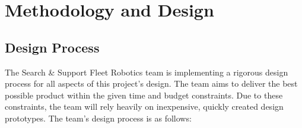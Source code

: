 \section{Methodology and Design}

\subsection{Design Process}

The Search \& Support Fleet Robotics team is implementing a rigorous design process for all aspects of this project's design. The team aims to deliver the best possible product within the given time and budget constraints. Due to these constraints, the team will rely heavily on inexpensive, quickly created design prototypes. The team’s design process is as follows:

